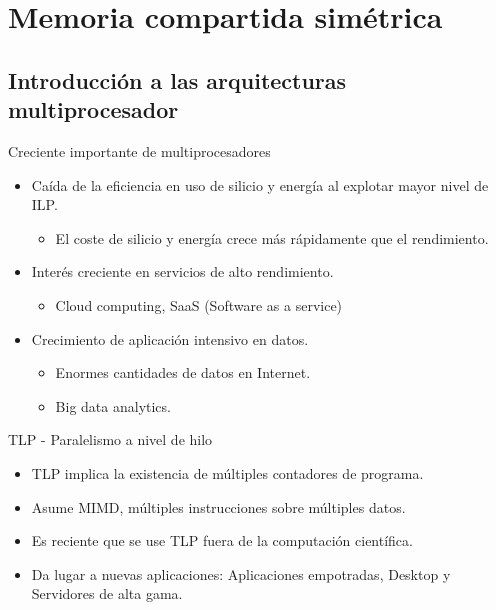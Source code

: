\documentclass[12pt, twoside, openright]{report} %
\begin{document}
 \section{Memoria compartida simétrica}


  
\subsection{Introducción a las arquitecturas multiprocesador}


    Creciente importante de multiprocesadores
    \vspace{-0.5cm}

    \begin{itemize}
    
    \item
      Caída de la eficiencia en uso de silicio y energía al explotar
      mayor nivel de ILP.

      \begin{itemize}
      
      \item
        El coste de silicio y energía crece más rápidamente que el
        rendimiento.
      \end{itemize}
    \item
      Interés creciente en servicios de alto rendimiento.

      \begin{itemize}
      
      \item
        Cloud computing, SaaS (Software as a service)
      \end{itemize}
    \item
      Crecimiento de aplicación intensivo en datos.

      \begin{itemize}
      
      \item
        Enormes cantidades de datos en Internet.
      \item
        Big data analytics.
      \end{itemize}
    \end{itemize}

    TLP - Paralelismo a nivel de hilo
    \vspace{-0.5cm}

    \begin{itemize}
    
    \item
      TLP implica la existencia de múltiples contadores de programa.
    \item
      Asume MIMD, múltiples instrucciones sobre múltiples datos.
    \item
      Es reciente que se use TLP fuera de la computación científica.
    \item
      Da lugar a nuevas aplicaciones: Aplicaciones empotradas, Desktop
      y Servidores de alta gama.
    \end{itemize}
\end{document}
